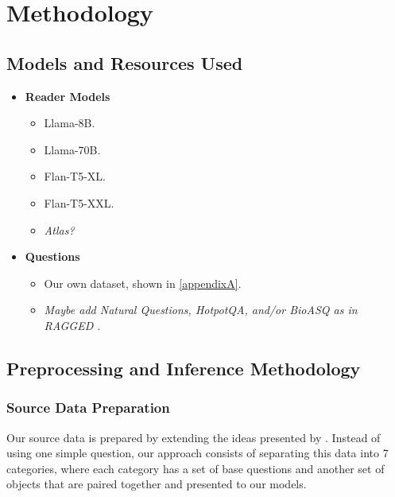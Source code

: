 \section{Methodology}

\newcommand{\param}{\ensuremath{p}}
\newcommand{\cparam}{\ensuremath{\overline{p}}}
\newcommand{\noctx}{\ensuremath{Q}}
\newcommand{\ctx}{\ensuremath{W}}
\newcommand{\NLL}{\text{NLL}}
\newcommand{\Perp}{\text{PPL}}

\newcommand{\cats}{7}
\newcommand{\baseqs}{68}
\newcommand{\things}{312}
\newcommand{\qs}{3840}

\subsection{Models and Resources Used}
\label{models_and_resources}

\begin{itemize}
	\item \textbf{Reader Models}
		\begin{itemize}
			\item Llama-8B.
			\item Llama-70B.
			\item Flan-T5-XL.
			\item Flan-T5-XXL.
			\item \textsl{Atlas?}
		\end{itemize}
	\item \textbf{Questions}
		\begin{itemize}
			\item Our own dataset, shown in \cref{appendixA}.
			\item \textsl{Maybe add \textsf{Natural Questions}, \textsf{HotpotQA}, and/or \textsf{BioASQ} as in \textup{\textsf{RAGGED} \citep{ragged}}}.
		\end{itemize}
\end{itemize}

\subsection{Preprocessing and Inference Methodology}

\subsubsection{Source Data Preparation}
\label{preparation}

Our source data is prepared by extending the ideas presented by \citeauthor{factual_recall}.
Instead of using one simple question, our approach consists of separating this data into \cats{} categories, where each category has a set of base questions and another set of objects that are paired together and presented to our models.

